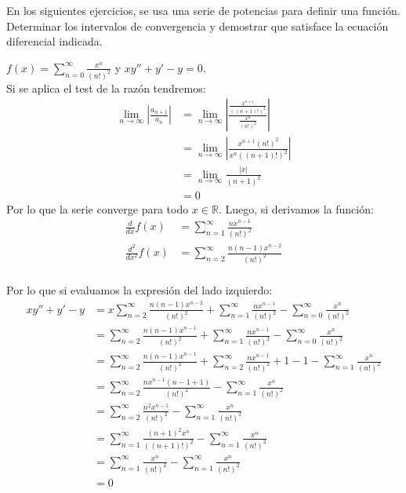 \documentclass[../main.tex]{subfiles}
\begin{document}
En los siguientes ejercicios, se usa una serie de potencias para definir una función. Determinar los intervalos de convergencia y demostrar que satisface la ecuación diferencial indicada. 

\question $f(x) = \sum\limits_{n = 0}^\infty \frac{x^n}{(n!)^2}$ y $xy'' + y' - y = 0$.\\

Si se aplica el test de la razón tendremos:
\begin{align*}
    \lim_{n \to \infty} \left|\frac{a_{n+1}}{a_n}\right| &= \lim_{n \to \infty} \left|\frac{\frac{x^{n+1}}{((n+1)!)^2}}{\frac{x^n}{(n!)^2}}\right|\\
    &= \lim_{n \to \infty} \left|\frac{x^{n+1} (n!)^2}{x^n ((n+1)!)^2}\right|\\
    &= \lim_{n \to \infty} \frac{|x|}{(n+1)^2}\\
    &= 0
\end{align*}
Por lo que la serie converge para todo $x \in \mathbb{R}$. Luego, si derivamos la función:
\begin{align*}
    \frac{d}{dx} f(x) &= \sum_{n = 1}^\infty \frac{nx^{n-1}}{(n!)^2}\\
    \frac{d^2}{dx^2} f(x) &= \sum_{n = 2}^\infty \frac{n(n-1)x^{n-2}}{(n!)^2}\\
\end{align*}

Por lo que si evaluamos la expresión del lado izquierdo:
\begin{align*}
    xy'' + y'-y &= x\sum_{n = 2}^\infty \frac{n(n-1)x^{n-2}}{(n!)^2} + \sum_{n = 1}^\infty \frac{nx^{n-1}}{(n!)^2} - \sum_{n = 0}^\infty \frac{x^n}{(n!)^2}\\
    &= \sum_{n = 2}^\infty \frac{n(n-1)x^{n-1}}{(n!)^2} + \sum_{n = 1}^\infty \frac{nx^{n-1}}{(n!)^2} - \sum_{n = 0}^\infty \frac{x^n}{(n!)^2}\\
    &= \sum_{n = 2}^\infty \frac{n(n-1)x^{n-1}}{(n!)^2} + \sum_{n = 2}^\infty \frac{nx^{n-1}}{(n!)^2} + 1 - 1 - \sum_{n = 1}^\infty \frac{x^n}{(n!)^2}\\
    &= \sum_{n = 2}^\infty \frac{nx^{n-1}(n-1+1)}{(n!)^2} - \sum_{n = 1}^\infty \frac{x^n}{(n!)^2}\\
    &= \sum_{n = 2}^\infty \frac{n^2x^{n-1}}{(n!)^2} - \sum_{n = 1}^\infty \frac{x^n}{(n!)^2}\\
    &= \sum_{n = 1}^\infty \frac{(n+1)^2x^{n}}{((n+1)!)^2} - \sum_{n = 1}^\infty \frac{x^n}{(n!)^2}\\
    &= \sum_{n = 1}^\infty \frac{x^{n}}{(n!)^2} - \sum_{n = 1}^\infty \frac{x^n}{(n!)^2}\\
    &= 0
\end{align*}
\end{document}
